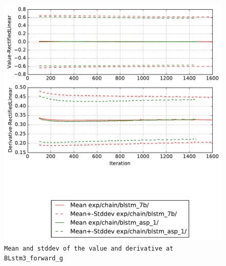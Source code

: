 \documentclass[prl,10pt,twocolumn]{revtex4}
\begin{document}
\newpage
\begin{figure}[h]
  \begin{center}
    \caption{\texttt{Mean and stddev of the value and derivative at BLstm3\_forward\_g}}
    \includegraphics[width=\textwidth]{exp/chain/blstm_7b/report/nonlinstats_BLstm3_forward_g.pdf}
  \end{center}
\end{figure}
\clearpage
\end{document}
